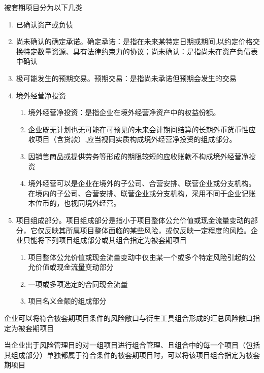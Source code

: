 \documentclass[UTF8,12pt]{ctexart}
\numberwithin{equation}{section} %
\numberwithin{figure}{section}
\numberwithin{table}{section}
\begin{document}
	被套期项目分为以下几类
	\begin{enumerate}
		\item 已确认资产或负债
		
		\item 尚未确认的确定承诺。确定承诺：是指在未来某特定日期或期间,以约定价格交换特定数量资源、具有法律约束力的协议；尚未确认：是指尚未在资产负债表中确认
		
		\item 极可能发生的预期交易。预期交易：是指尚未承诺但预期会发生的交易
		
		\item 境外经营净投资
		\begin{enumerate}
			\item 境外经营净投资：是指企业在境外经营净资产中的权益份额。
			
			\item 企业既无计划也无可能在可预见的未来会计期间结算的长期外币货币性应收项目（含贷款）,应当视同实质构成境外经营净投资的组成部分。
			
			\item 因销售商品或提供劳务等形成的期限较短的应收账款不构成境外经营净投资
			
			\item 境外经营可以是企业在境外的子公司、合营安排、联营企业或分支机构。在境内的子公司、合营安排、联营企业或分支机构，采用不同于企业记账本位币的，也视同境外经营。
		\end{enumerate}
		
		\item 项目组成部分。项目组成部分是指小于项目整体公允价值或现金流量变动的部分，它仅反映其所属项目整体面临的某些风险，或仅反映一定程度的风险。企业只能将下列项目组成部分或其组合指定为被套期项目
		\begin{enumerate}
			\item 项目整体公允价值或现金流量变动中仅由某一个或多个特定风险引起的公允价值或现金流量变动部分
			
			\item 一项或多项选定的合同现金流量
			
			\item 项目名义金额的组成部分
		\end{enumerate}
	\end{enumerate}

	企业可以将符合被套期项目条件的风险敞口与衍生工具组合形成的汇总风险敞口指定为被套期项目
	
	当企业出于风险管理目的对一组项目进行组合管理、且组合中的每一个项目（包括其组成部分）单独都属于符合条件的被套期项目时，可以将该项目组合指定为被套期项目
	
\end{document}
